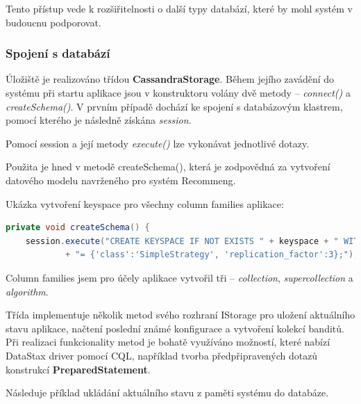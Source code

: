 \documentclass[thesis=M,czech]{FITthesis}[2014/05/07]
\begin{document}
Tento přístup vede k rozšiřitelnosti o další typy databází, které by mohl systém v budoucnu podporovat. 

\subsubsection{Spojení s databází}
Úložiště je realizováno třídou \textbf{CassandraStorage}. Během jejího zavádění do systému při startu aplikace jsou v konstruktoru volány dvě metody – \emph{connect()} a \emph{createSchema()}. V prvním případě dochází ke spojení s databázovým klastrem, pomocí kterého je následně získána \emph{session}.

Pomocí session a její metody \emph{execute()} lze vykonávat jednotlivé dotazy. 

Použita je hned v metodě createSchema(), která je zodpovědná za vytvoření datového modelu navrženého pro systém Recommeng.

Ukázka vytvoření keyspace pro všechny column families aplikace:

\begin{lstlisting}[language=java]
private void createSchema() {        
    session.execute("CREATE KEYSPACE IF NOT EXISTS " + keyspace + " WITH replication "
            + "= {'class':'SimpleStrategy', 'replication_factor':3};");
\end{lstlisting}

Column families jsem pro účely aplikace vytvořil tři – \emph{collection}, \emph{supercollection} a \emph{algorithm}.

Třída implementuje několik metod svého rozhraní IStorage pro uložení aktuálního stavu aplikace, načtení poslední známé konfigurace a vytvoření kolekcí banditů. Při realizaci funkcionality metod je bohatě využíváno možností, které nabízí DataStax driver pomocí CQL, například tvorba předpřipravených dotazů konstrukcí \textbf{PreparedStatement}. 

Následuje příklad ukládání aktuálního stavu z paměti systému do databáze.
\end{document}
